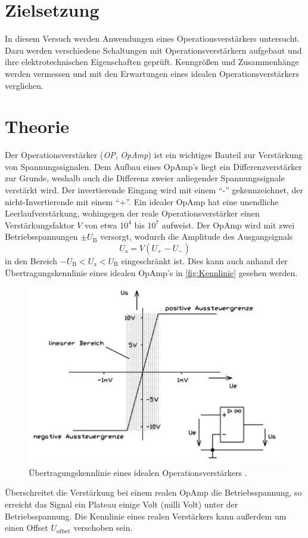 \section{Zielsetzung}
In diesem Versuch werden Anwendungen eines Operationsverstärkers untersucht.
Dazu werden verschiedene Schaltungen mit Operationsverstärkern aufgebaut und ihre elektrotechnischen Eigenschaften geprüft.
Kenngrößen und Zusammenhänge werden vermessen und mit den Erwartungen eines idealen Operationsverstärkers verglichen.
 
\section{Theorie}
\label{sec:Theorie}
Der Operationsverstärker (\textit{OP}, \textit{OpAmp}) ist ein wichtiges Bauteil zur Verstärkung von Spannungssignalen.
Dem Aufbau eines OpAmp's liegt ein Differenzverstärker zur Grunde, weshalb auch die Differenz zweier anliegender Spannungssignale verstärkt wird.
Der invertierende Eingang wird mit einem \enquote{-} gekennzeichnet, der nicht-Invertierende mit einem \enquote{+}.
Ein idealer OpAmp hat eine unendliche Leerlaufverstärkung, wohingegen der reale Operationsverstärker einen Verstärkungsfaktor $V$ von etwa $10^4$ bis $10^7$ aufweist.
Der OpAmp wird mit zwei Betriebsspannungen $\pm U_\text{B}$ versorgt, wodurch die Amplitude des Ausgangsignals 
\begin{equation}
    U_\text{a} = V (U_+ - U_-)
    \label{eq:U_a}
\end{equation}
in den Bereich $-U_\text{B} < U_\text{a} < U_\text{B}$ eingeschränkt ist.
Dies kann auch anhand der Übertragungskennlinie eines idealen OpAmp's in \autoref{fig:Kennlinie} gesehen werden.
\begin{figure}
    \centering
    \includegraphics[width = .7\textwidth]{"content/pics/Kennlinie.png"}
    \caption{Übertragungskennlinie eines idealen Operationsverstärkers \cite{Federau2017}.}
    \label{fig:Kennlinie}
\end{figure}
Überschreitet die Verstärkung bei einem realen OpAmp die Betriebsspannung, so erreicht das Signal ein Plateau einige Volt (milli Volt) unter der Betriebsspannung.
Die Kennlinie eines realen Verstärkers kann außerdem um einen Offset $U_\text{offset}$ verschoben sein.

